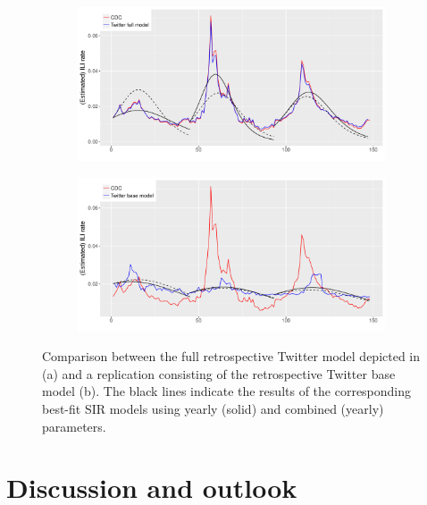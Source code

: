 \documentclass[11pt, a4paper,twoside]{report}\usepackage[]{graphicx}\usepackage[]{color}
\begin{document}
\begin{figure}[htbp!]
\centering
  \begin{subfigure}[t]{1\textwidth}
  \includegraphics[width=1\linewidth]{40_SIR_model_full_both_25_colorised.pdf}
  \caption{}
  \end{subfigure}
  
  \begin{subfigure}[t]{1\textwidth}
  \includegraphics[width=1\linewidth]{42_SIR_model_full_base_model_50_colorised.pdf}
  \caption{}
  \end{subfigure}
  \caption{Comparison between the full retrospective Twitter model depicted in \cite{bodnar_data_2015} (a) and a replication consisting of the retrospective Twitter base model (b). The black lines indicate the results of the corresponding best-fit SIR models using yearly (solid) and combined (yearly) parameters.}
  \label{fig:TwitterModel_comparison_base}
\end{figure}

\thispagestyle{empty}
\cleardoublepage

\chapter{Discussion and outlook}
\label{ch:discussion}
\end{document}
